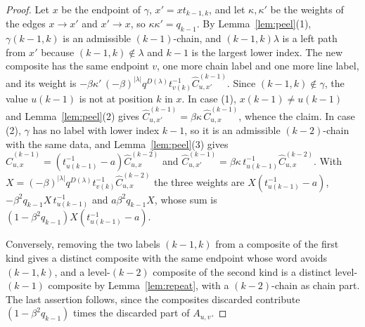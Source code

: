 \documentclass[11pt]{article}
\begin{document}
\begin{proof}
Let $x$ be the endpoint of $\gamma$, $x'=xt_{k-1,k}$, and let
$\kappa,\kappa'$ be the weights of the edges $x\to x'$ and $x'\to x$,
so $\kappa\kappa'=q_{k-1}$. By Lemma~\ref{lem:peel}(1),
$\gamma(k-1,k)$ is an admissible $(k-1)$-chain, and $(k-1,k)\lambda$
is a left path from $x'$ because $(k-1,k)\notin\lambda$ and $k-1$ is
the largest lower index. The new composite has the same endpoint $v$,
one more chain label and one more line label, and its weight is
$-\beta\kappa'\,(-\beta)^{|\lambda|}q^{D(\lambda)}t^{-1}_{v(k)}
 \widehat C^{(k-1)}_{u,x'}$. Since $(k-1,k)\notin\gamma$, the value
$u(k-1)$ is not at position $k$ in $x$. In case (1),
$x(k-1)\neq u(k-1)$ and Lemma~\ref{lem:peel}(2) gives
$\widehat C^{(k-1)}_{u,x'}=\beta\kappa\,\widehat C^{(k-1)}_{u,x}$, whence
the claim. In case (2), $\gamma$ has no label with lower index $k-1$,
so it is an admissible $(k-2)$-chain with the same data, and
Lemma~\ref{lem:peel}(3) gives
$\widehat C^{(k-1)}_{u,x}=(t^{-1}_{u(k-1)}-a)\widehat C^{(k-2)}_{u,x}$ and
$\widehat C^{(k-1)}_{u,x'}=\beta\kappa\,t^{-1}_{u(k-1)}\widehat C^{(k-2)}_{u,x}$.
With $X=(-\beta)^{|\lambda|}q^{D(\lambda)}t^{-1}_{v(k)}\widehat C^{(k-2)}_{u,x}$
the three weights are $X(t^{-1}_{u(k-1)}-a)$,
$-\beta^2q_{k-1}X\,t^{-1}_{u(k-1)}$ and $a\beta^2q_{k-1}X$, whose sum is
$(1-\beta^2q_{k-1})X(t^{-1}_{u(k-1)}-a)$.

Conversely, removing the two labels $(k-1,k)$ from a composite of the
first kind gives a distinct composite with the same endpoint whose
word avoids $(k-1,k)$, and a level-$(k-2)$ composite of the second kind
is a distinct level-$(k-1)$ composite by Lemma~\ref{lem:repeat}, with
a $(k-2)$-chain as chain part. The last assertion follows, since the
composites discarded contribute $(1-\beta^2q_{k-1})$ times the
discarded part of $A_{u,v}$.
\end{proof}
\end{document}
